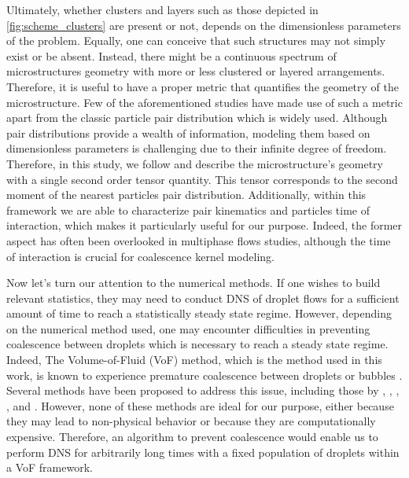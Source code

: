 


Ultimately, whether clusters and layers such as those depicted in \ref{fig:scheme_clusters} are present or not, depends on the dimensionless parameters of the problem. 
Equally, one can conceive that such structures may not simply exist or be absent. 
Instead, there might be a continuous spectrum of microstructures geometry with more or less clustered or layered arrangements. 
Therefore, it is useful to have a proper metric that quantifies the geometry of the microstructure. 
Few of the aforementioned studies have made use of such a metric apart from the classic particle pair distribution which is widely used.
Although pair distributions provide a wealth of information, modeling them based on dimensionless parameters is challenging due to their infinite degree of freedom. 
Therefore, in this study, we follow \citet{zhang2023evolution} and describe the microstructure's geometry with a single second order tensor quantity. 
This tensor corresponds to the second moment of the nearest particles pair distribution.  
Additionally, within this framework we are able to characterize pair kinematics and particles time of interaction, which makes it particularly useful for our purpose. 
Indeed, the former aspect has often been overlooked in multiphase flows studies, although the time of interaction is crucial for coalescence kernel modeling.

Now let's turn our attention to the numerical methods.
If one wishes to build relevant statistics, they may need to conduct DNS of droplet flows for a sufficient amount of time to reach a statistically steady state regime. 
However, depending on the numerical method used, one may encounter difficulties in preventing coalescence between droplets which is necessary to reach a steady state regime. 
Indeed, The Volume-of-Fluid (VoF) method, which is the method used in this work, is known to experience premature coalescence between droplets or bubbles \citep{innocenti2020direct}.
Several methods have been proposed to address this issue, including those by \citet{roghair2011drag}, \citet{hidman2023assessing}, \citet{balcazar2015multiple}, \citet{zhang2023evolution}, and \citet{karnakov2022computing}. 
However, none of these methods are ideal for our purpose, either because they may lead to non-physical behavior or because they are computationally expensive. Therefore, an algorithm to prevent coalescence would enable us to perform DNS for arbitrarily long times with a fixed population of droplets within a VoF framework.


